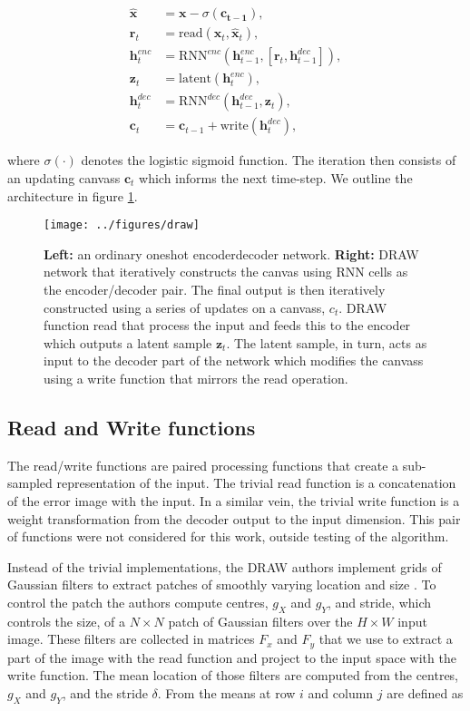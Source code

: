 \begin{align}
\hat{\mathbf{x}} &= \mathbf{x} - \sigma(\mathbf{c_{t-1}}), \\
\mathbf{r}_t &= \text{read}(\mathbf{x}_t, \hat{\mathbf{x}}_t ), \\
\mathbf{h}^{enc}_t &= \text{RNN}^{enc}( \mathbf{h}^{enc}_{t-1}, [\mathbf{r}_t, \mathbf{h}^{dec}_{t-1}]),\\
\mathbf{z}_t &= \text{latent}(\mathbf{h}^{enc}_t),\\
\mathbf{h}^{dec}_t &= \text{RNN}^{dec}( \mathbf{h}^{dec}_{t-1}, \mathbf{z}_t),\\
\mathbf{c}_t &= \mathbf{c}_{t-1} + \text{write}(\mathbf{h}_t^{dec}) \label{eq:draw},
\end{align} 

 \noindent where $\sigma(\cdot)$ denotes the logistic sigmoid function. The iteration then consists of an updating canvass $\mathbf{c}_t$ which informs the next time-step. We outline the architecture in figure \ref{fig:draw}.

\begin{figure}[h]
\centering
\texttt{[image: ../figures/draw]}
\caption[DRAW network architecture]{\textbf{Left:} an ordinary one\-shot encoder\-decoder network. \textbf{Right:} DRAW network that iteratively constructs the canvas using RNN cells as the encoder/decoder pair. The final output is then iteratively constructed using a series of updates on a canvass, $c_t$. DRAW function read that process the input and feeds this to the encoder which outputs a latent sample $\mathbf{z}_t$. The latent sample, in turn, acts as input to the decoder part of the network which modifies the canvass using a write function that mirrors the read operation.}\label{fig:draw}
\end{figure}
 
 \subsection{Read and Write functions}

 The read/write functions are paired processing functions that create a sub-sampled representation of the input. The trivial read function is a concatenation of the error image with the input. In a similar vein, the trivial write function is a weight transformation from the decoder output to the input dimension. This pair of functions were not considered for this work, outside testing of the algorithm.  

 Instead of the trivial implementations, the DRAW authors implement grids of Gaussian filters to extract patches of smoothly varying location and size \cite{Gregor2015}. To control the patch the authors compute centres, $g_X$ and $g_Y$, and stride, which controls the size, of a $N \times N$ patch of Gaussian filters over the $H \times W$ input image.  These filters are collected in matrices $F_x$ and $F_y$ that we use to extract a part of the image with the read function and project to the input space with the write function. The mean location of those filters are computed from the centres, $g_X$ and $g_Y$, and the stride $\delta$. From \citet{Gregor2015} the means at row $i$ and column $j$ are defined as 

